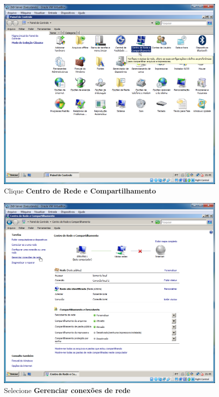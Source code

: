 \documentclass[10pt]{article}
\begin{document}
\begin{figure}[H]
    \centering
    \caption{Clique \textbf{Centro de Rede e Compartilhamento}}
    \label{fig:re022}
    \includegraphics[width=\linewidth]{images/rede_externa/re022.png}
\end{figure}
\begin{figure}[H]
    \centering
    \caption{Selecione \textbf{Gerenciar conexões de rede}}
    \label{fig:re023}
    \includegraphics[width=\linewidth]{images/rede_externa/re023.png}
\end{figure}
\end{document}
